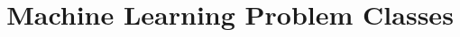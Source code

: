 \documentclass[a4paper, answers]{exam}
\title{Machine Learning Problem Classes}
\author{}
\begin{document}
    \maketitle
    \begin{questions}
%       
%       
        
    \end{questions}
\end{document}
